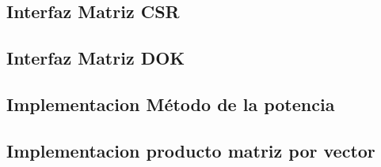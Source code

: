 \subsection*{Interfaz Matriz CSR}
    

\subsection*{Interfaz Matriz DOK}
    

\subsection*{Implementacion Método de la potencia}
    

\subsection*{Implementacion producto matriz por vector}
    
